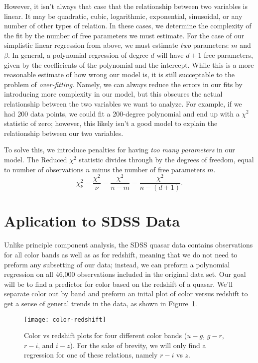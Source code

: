 However, it isn't always that case that the relationship between two variables is linear. It may be quadratic, cubic, logarithmic, exponential, sinusoidal, or any number of other types of relation. In these cases, we determine the complexity of the fit by the number of free parameters we must estimate. For the case of our simplistic linear regression from above, we must estimate \emph{two} parameters: $m$ and $\beta$. In general, a polynomial regression of degree $d$ will have $d + 1$ free parameters, given by the coefficients of the polynomial and the intercept. While this is a more reasonable estimate of how wrong our model is, it is still succeptable to the problem of \emph{over-fitting}. Namely, we can always reduce the errors in our fits by introducing more complexity in our model, but this obscures the actual relationship between the two variables we want to analyze. For example, if we had 200 data points, we could fit a 200-degree polynomial and end up with a $\chi^2$ statistic of zero; however, this likely isn't a good model to explain the relationship between our two variables.

To solve this, we introduce penalties for having \emph{too many parameters} in our model. The Reduced $\chi^2$ statistic divides through by the degrees of freedom, equal to number of observations $n$ minus the number of free parameters $m$.
\[ \chi^2_\nu = \frac{\chi^2}{\nu} = \frac{\chi^2}{n - m} = \frac{\chi^2}{n - (d + 1)}. \]

\section{Aplication to SDSS Data}
Unlike principle component analysis, the SDSS quasar data contains observations for all color bands as well as as for redshift, meaning that we do not need to preform any subsetting of our data; instead, we can preform a polynomial regression on all 46,000 observations included in the original data set. Our goal will be to find a predictor for color based on the redshift of a quasar. We'll separate color out by band and preform an inital plot of color versus redshift to get a sense of general trends in the data, as shown in Figure~\ref{fig:color-redshift}.

\begin{figure}
	\texttt{[image: color-redshift]}
	\caption{Color vs redshift plots for four different color bands ($u-g$, $g-r$, $r-i$, and $i-z$). For the sake of brevity, we will only find a regression for one of these relations, namely $r-i$ vs $z$.}
	\label{fig:color-redshift}
\end{figure}

